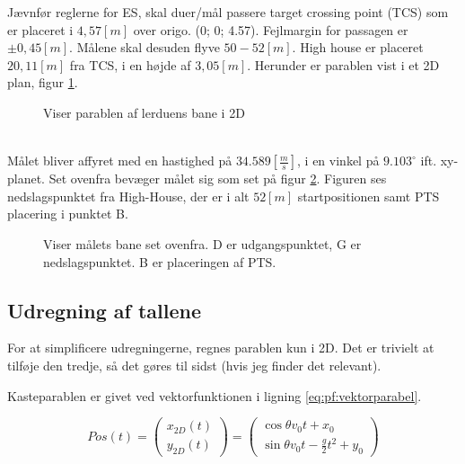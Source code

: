 Jævnfør reglerne for ES, skal duer/mål passere target crossing point (TCS) som er 
placeret i $4,57 [m]$ over origo. (0; 0; 4.57). Fejlmargin for passagen er $\pm0,45 [m]$. 
Målene skal desuden flyve $50 - 52 [m]$.  High house er placeret $20,11 [m]$ fra TCS, i en 
højde af $3,05 [m]$. 
Herunder er parablen vist i et 
2D plan, figur \ref{fig:HH2D_para}.
\begin{figure}[!th]
\centering
\begin{tikzpicture}[scale=1]

\end{tikzpicture}
\caption[Lerdue parabel]{Viser parablen af lerduens bane i 2D}
\label{fig:HH2D_para}
\end{figure}
~\\[10pt]
Målet bliver affyret med en hastighed på $34.589 [\frac{m}{s}]$, i en vinkel på $9.103^{\circ}$ ift. xy-
planet. Set ovenfra bevæger målet sig som set på figur \ref{fig:para_in_xy_plane}. 
Figuren ses nedslagspunktet fra High-House, der er i alt $52 [m]$ startpositionen samt 
PTS placering i punktet B. 



\begin{figure}[!th]
\centering
\begin{tikzpicture}[scale=0.2]

\end{tikzpicture}
\caption[tekst i indholdsfortegnelsen]{Viser målets bane set ovenfra. D er udgangspunktet, G er nedslagspunktet. B er placeringen af PTS.}
\label{fig:para_in_xy_plane}
\end{figure}

\subsection{Udregning af tallene}

For at simplificere udregningerne, regnes parablen kun i 2D. Det er trivielt at tilføje den tredje, så det gøres til sidst (hvis jeg finder det relevant). 

Kasteparablen er givet ved vektorfunktionen i ligning  \ref{eq:pf:vektorparabel}.

\begin{equation}
	Pos(t) = \left( \begin{array}{c}
	x_{2D}(t) \\
	y_{2D}(t)
	\end{array}
	\right)
	= \left( \begin{array}{c}
	\cos \theta v_0 t + x_0 \\
	\sin \theta v_0 t - \frac{g}{2} t^2 + y_0
	\end{array}
	\right)
\label{eq:pf:vektorparabel}
\end{equation}

